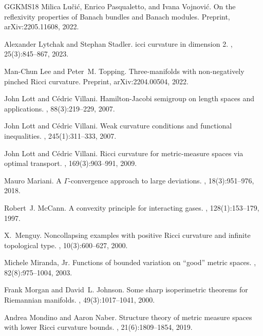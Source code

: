 \documentclass[11pt]{article}
\numberwithin{equation}{section}
\begin{document}
{\begin{thebibliography}{GGKMS18}
Milica Lu\v{c}i\'{c}, Enrico Pasqualetto, and Ivana Vojnovi\'{c}.
\newblock On the reflexivity properties of {B}anach bundles and {B}anach
  modules.
\newblock Preprint, arXiv:2205.11608, 2022.

Alexander Lytchak and Stephan Stadler.
icci curvature in dimension 2.
, 25(3):845--867, 2023.

Man-Chun Lee and Peter~M. Topping.
\newblock Three-manifolds with non-negatively pinched {R}icci curvature.
\newblock Preprint, arXiv:2204.00504, 2022.

John Lott and C{\'e}dric Villani.
\newblock Hamilton-{J}acobi semigroup on length spaces and applications.
, 88(3):219--229, 2007.

John Lott and C{\'e}dric Villani.
\newblock Weak curvature conditions and functional inequalities.
, 245(1):311--333, 2007.

John Lott and C{\'e}dric Villani.
\newblock Ricci curvature for metric-measure spaces via optimal transport.
, 169(3):903--991, 2009.

Mauro Mariani.
\newblock A {$\Gamma$}-convergence approach to large deviations.
, 18(3):951--976, 2018.

Robert~J. McCann.
\newblock A convexity principle for interacting gases.
, 128(1):153--179, 1997.

X.~Menguy.
\newblock Noncollapsing examples with positive {R}icci curvature and infinite
  topological type.
, 10(3):600--627, 2000.

Michele Miranda, Jr.
\newblock Functions of bounded variation on ``good'' metric spaces.
, 82(8):975--1004, 2003.

Frank Morgan and David~L. Johnson.
\newblock Some sharp isoperimetric theorems for {R}iemannian manifolds.
, 49(3):1017--1041, 2000.

Andrea Mondino and Aaron Naber.
\newblock Structure theory of metric measure spaces with lower {R}icci
  curvature bounds.
, 21(6):1809--1854, 2019.


\end{thebibliography}}
\end{document}
